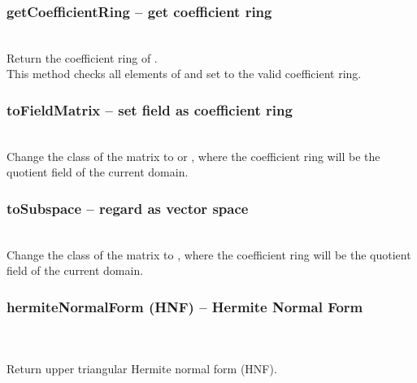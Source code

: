 \subsubsection{getCoefficientRing -- get coefficient ring}
   \\
   \spacing
   \quad Return the coefficient ring of .\\
   \spacing
   \quad This method checks all elements of  and set  to the valid coefficient ring.\\
   \spacing
  \subsubsection{toFieldMatrix -- set field as coefficient ring}
   \\
   \spacing
   \quad Change the class of the matrix to  or , where the coefficient ring will be the quotient field of the current domain.\\
   \spacing
  \subsubsection{toSubspace -- regard as vector space}
   \\
   \spacing
   \quad Change the class of the matrix to , where the coefficient ring will be the quotient field of the current domain.\\
   \spacing
  \subsubsection{hermiteNormalForm (HNF) -- Hermite Normal Form}
   \\
   \\
   \spacing
   \quad Return upper triangular Hermite normal form (HNF).\\
   \spacing
